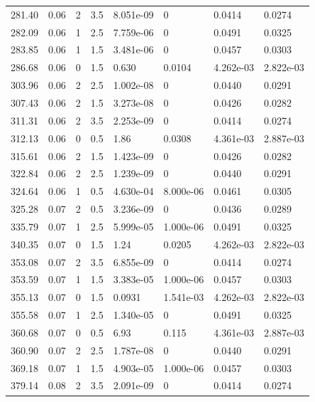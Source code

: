 \documentclass[preview]{standalone}
\begin{document}
{{{\begin{tabular}{L{1.2cm}C{1.2cm} C{0.3cm}C{0.5cm} C{1.4cm}C{1.4cm} C{1.4cm}C{1.4cm}}
  281.40  &  0.06  & 2     & 3.5 &  8.051e-09  & 0  & 0.0414 &  0.0274   \\ 
  282.09  &  0.06  & 1     & 2.5 &  7.759e-06  & 0  & 0.0491 &  0.0325   \\ 
  283.85  &  0.06  & 1     & 1.5 &  3.481e-06  & 0  & 0.0457 &  0.0303   \\ 
  286.68  &  0.06  & 0     & 1.5 &  0.630  & 0.0104  & 4.262e-03 &  2.822e-03   \\ 
  303.96  &  0.06  & 2     & 2.5 &  1.002e-08  & 0  & 0.0440 &  0.0291   \\ 
  307.43  &  0.06  & 2     & 1.5 &  3.273e-08  & 0  & 0.0426 &  0.0282   \\ 
  311.31  &  0.06  & 2     & 3.5 &  2.253e-09  & 0  & 0.0414 &  0.0274   \\ 
  312.13  &  0.06  & 0     & 0.5 &  1.86  & 0.0308  & 4.361e-03 &  2.887e-03   \\ 
  315.61  &  0.06  & 2     & 1.5 &  1.423e-09  & 0  & 0.0426 &  0.0282   \\ 
  322.84  &  0.06  & 2     & 2.5 &  1.239e-09  & 0  & 0.0440 &  0.0291   \\ 
  324.64  &  0.06  & 1     & 0.5 &  4.630e-04  & 8.000e-06  & 0.0461 &  0.0305   \\ 
  325.28  &  0.07  & 2     & 0.5 &  3.236e-09  & 0  & 0.0436 &  0.0289   \\ 
  335.79  &  0.07  & 1     & 2.5 &  5.999e-05  & 1.000e-06  & 0.0491 &  0.0325   \\ 
  340.35  &  0.07  & 0     & 1.5 &  1.24  & 0.0205  & 4.262e-03 &  2.822e-03   \\ 
  353.08  &  0.07  & 2     & 3.5 &  6.855e-09  & 0  & 0.0414 &  0.0274   \\ 
  353.59  &  0.07  & 1     & 1.5 &  3.383e-05  & 1.000e-06  & 0.0457 &  0.0303   \\ 
  355.13  &  0.07  & 0     & 1.5 &  0.0931  & 1.541e-03  & 4.262e-03 &  2.822e-03   \\ 
  355.58  &  0.07  & 1     & 2.5 &  1.340e-05  & 0  & 0.0491 &  0.0325   \\ 
  360.68  &  0.07  & 0     & 0.5 &  6.93  & 0.115  & 4.361e-03 &  2.887e-03   \\ 
  360.90  &  0.07  & 2     & 2.5 &  1.787e-08  & 0  & 0.0440 &  0.0291   \\ 
  369.18  &  0.07  & 1     & 1.5 &  4.903e-05  & 1.000e-06  & 0.0457 &  0.0303   \\ 
  379.14  &  0.08  & 2     & 3.5 &  2.091e-09  & 0  & 0.0414 &  0.0274   \\ 

\end{tabular}}}}
\end{document}
